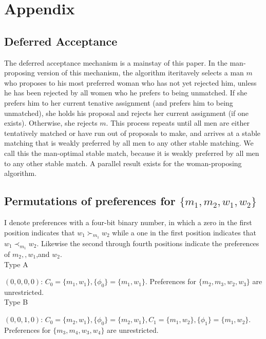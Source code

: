 \documentclass[WP]{AEA}
\begin{document}



\appendix



\section{ Appendix}

\subsection{Deferred Acceptance}
The deferred acceptance mechanism is a mainstay of this paper. In the man-proposing version of this mechanism, the algorithm iteritavely selects a man $m$ who proposes to his most preferred woman who has not yet rejected him, unless he has been rejected by all women who he prefers to being unmatched.  If she prefers him to her current tenative assignment (and prefers him to being unmatched), she holds his proposal and rejects her current assignment (if one exists). Otherwise, she rejects $m$.  This process repeats until all men are either tentatively matched or have run out of proposals to make, and arrives at a stable matching that is weakly preferred by all men to any other stable matching.  We call this the man-optimal stable match, because it is weakly preferred by all men to any other stable match.  A parallel result exists for the woman-proposing algorithm.


\subsection{Permutations of preferences for $\{m_1,m_2,w_1,w_2\}$}
I denote preferences with a four-bit binary number, in which a zero in the first position indicates that $w_1\succ_{m_1} w_2$ while a one in the first position indicates that $w_1\prec_{m_1} w_2$. Likewise the second through fourth positions indicate the preferences of $m_2, ,w_1$,and $w_2$.
\\
Type A

$(0,0,0,0)$: $C_0 =\{m_1,w_1\}, \{\phi_0\}=\{m_1,w_1\}$.  Preferences for $\{m_2,m_3,w_2,w_3\}$ are unrestricted.
\\

Type B

$(0,0,1,0)$: $C_0 =\{m_2,w_1\}, \{\phi_0\}=\{m_2,w_1\}, C_1 =\{m_1,w_2\}, \{\phi_1\}=\{m_1,w_2\}$.  Preferences for $\{m_3,m_4,w_3,w_4\}$ are unrestricted.
\end{document}
